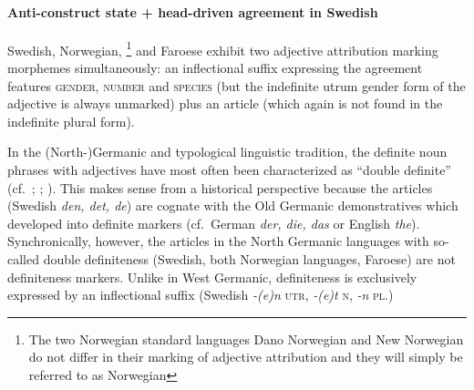 \paragraph{Anti-construct state + head-driven agreement in Swedish}\label{swedish synchr}
Swedish, Norwegian,
\footnote{The two Norwegian standard languages Dano Norwegian and New Norwegian do not differ in their marking of adjective attribution and they will simply be referred to as Norwegian}
 and Faroese exhibit two adjective attribution marking morphemes simultaneously: an inflectional suffix expressing the agreement features \textsc{gender}, \textsc{number} and \textsc{species} (but the indefinite utrum gender form of the adjective is always unmarked) plus an article (which again is not found in the indefinite plural form).

In the (North-)Germanic and typological linguistic tradition, the definite noun phrases with adjectives have most often been characterized as “double definite” (cf.~\citealt{borjars1994}; \citealt{julien2003}; \citealt[354–355]{plank2003}). This makes sense from a historical perspective because the articles (Swedish \textit{den, det, de}) are cognate with the Old Germanic demonstratives which developed into definite markers (cf.~German \textit{der, die, das} or English \textit{the}). Synchronically, however, the articles in the North Germanic languages with so-called double definiteness (Swedish, both Norwegian languages, Faroese) are not definiteness markers. Unlike in West Germanic, definiteness is exclusively expressed by an inflectional suffix (Swedish \textit{-(e)n} \textsc{utr}, \textit{-(e)t} \textsc{n}, \textit{-n} \textsc{pl}.)

